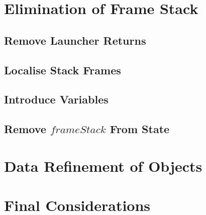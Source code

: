 

\section{Elimination of Frame Stack}
\label{elimination-of-frame-stack-section}



\subsection{Remove Launcher Returns}
\label{remove-launcher-returns-subsection}



\subsection{Localise Stack Frames}
\label{localise-stack-frames-subsection}



\subsection{Introduce Variables}
\label{introduce-variables-subsection}



\subsection{Remove $frameStack$ From State}
\label{remove-frameStack-from-state-subsection}



\section{Data Refinement of Objects}
\label{data-refinement-of-objects-section}



\section{Final Considerations}
\label{compilation-final-considerations-section}